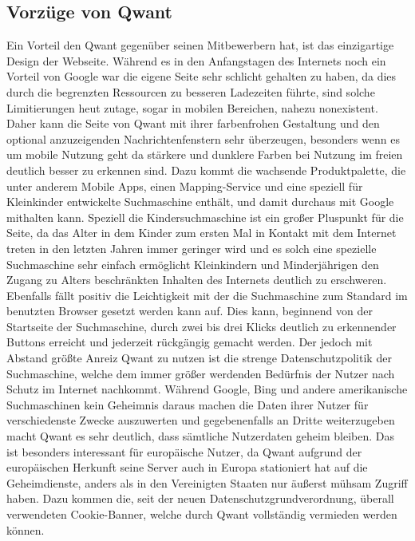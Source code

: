\subsection{Vorzüge von Qwant}\label{subsec:vorzuge-von-qwant}
Ein Vorteil den Qwant gegenüber seinen Mitbewerbern hat, ist das einzigartige Design der Webseite.
Während es in den Anfangstagen des Internets noch ein Vorteil von Google war die eigene Seite sehr schlicht gehalten zu
haben, da dies durch die begrenzten Ressourcen zu besseren Ladezeiten führte, sind solche Limitierungen heut zutage, sogar
in mobilen Bereichen, nahezu nonexistent.
Daher kann die Seite von Qwant mit ihrer farbenfrohen Gestaltung und den optional anzuzeigenden Nachrichtenfenstern sehr
überzeugen, besonders wenn es um mobile Nutzung geht da stärkere und dunklere Farben bei Nutzung im freien deutlich besser
zu erkennen sind.
Dazu kommt die wachsende Produktpalette, die unter anderem Mobile Apps, einen Mapping-Service und eine speziell für
Kleinkinder entwickelte Suchmaschine enthält, und damit durchaus mit Google mithalten kann.
Speziell die Kindersuchmaschine ist ein großer Pluspunkt für die Seite, da das Alter in dem Kinder zum ersten Mal in
Kontakt mit dem Internet treten in den letzten Jahren immer geringer wird und es solch eine spezielle Suchmaschine
sehr einfach ermöglicht Kleinkindern und Minderjährigen den Zugang zu Alters beschränkten Inhalten des Internets
deutlich zu erschweren.
Ebenfalls fällt positiv die Leichtigkeit mit der die Suchmaschine zum Standard im benutzten Browser gesetzt werden kann auf.
Dies kann, beginnend von der Startseite der Suchmaschine, durch zwei bis drei Klicks deutlich zu erkennender Buttons
erreicht und jederzeit rückgängig gemacht werden.
Der jedoch mit Abstand größte Anreiz Qwant zu nutzen ist die strenge Datenschutzpolitik der Suchmaschine, welche dem
immer größer werdenden Bedürfnis der Nutzer nach Schutz im Internet nachkommt.
Während Google, Bing und andere amerikanische Suchmaschinen kein Geheimnis daraus machen die Daten ihrer Nutzer für
verschiedenste Zwecke auszuwerten und gegebenenfalls an Dritte weiterzugeben macht Qwant es sehr deutlich, dass sämtliche
Nutzerdaten geheim bleiben.
Das ist besonders interessant für europäische Nutzer, da Qwant aufgrund der europäischen Herkunft seine Server auch in Europa
stationiert hat auf die Geheimdienste, anders als in den Vereinigten Staaten nur äußerst mühsam Zugriff haben.
Dazu kommen die, seit der neuen Datenschutzgrundverordnung, überall verwendeten Cookie-Banner, welche durch Qwant
vollständig vermieden werden können.

